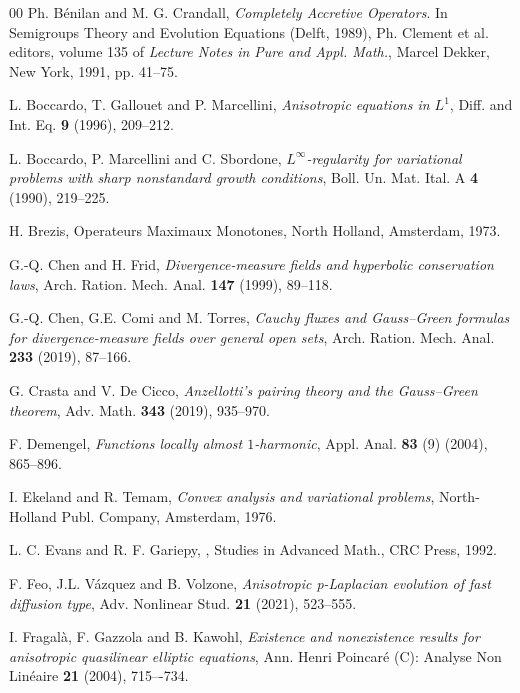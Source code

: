 \documentclass[reqno,12pt]{amsart}
\numberwithin{equation}{section}
\begin{document}
\begin{thebibliography}{00}
 Ph. B\'enilan and M. G. Crandall, {\it Completely Accretive Operators}. In Semigroups Theory and Evolution Equations (Delft, 1989), Ph. Clement et al. editors, volume 135 of {\it Lecture Notes in Pure and Appl. Math.}, Marcel Dekker, New York, 1991, pp. 41--75.

 L. Boccardo, T. Gallouet and P. Marcellini, {\it Anisotropic equations in $L^1$}, Diff. and Int. Eq. {\bf 9} (1996), 209--212.

 L. Boccardo, P. Marcellini and C. Sbordone, {\it $L^\infty$-regularity for variational problems with sharp nonstandard growth conditions}, Boll. Un. Mat. Ital. A {\bf 4} (1990), 219--225.

 H. Brezis, {Operateurs Maximaux Monotones}, North Holland, Amsterdam, 1973.

 G.-Q. Chen and H. Frid, {\it Divergence-measure fields and hyperbolic conservation laws}, Arch. Ration. Mech. Anal. {\bf 147} (1999), 89--118.

 G.-Q. Chen, G.E. Comi and M. Torres, {\it Cauchy fluxes and Gauss–Green formulas for divergence-measure fields over general open sets}, Arch. Ration. Mech. Anal. {\bf 233} (2019), 87--166.

 G. Crasta and V. De Cicco, {\it Anzellotti's pairing theory and the Gauss–Green theorem}, Adv. Math. {\bf 343} (2019), 935--970.

 F. Demengel, {\it Functions locally almost $1$-harmonic}, Appl. Anal. {\bf 83} (9) (2004), 865--896.


 I. Ekeland and R. Temam, {\it Convex analysis and variational problems}, North-Holland Publ. Company, Amsterdam, 1976.

 L. C. Evans and R. F. Gariepy, , \newblock Studies in Advanced Math., CRC Press, 1992.

 F. Feo, J.L. V\'{a}zquez and B. Volzone, {\it Anisotropic p-Laplacian evolution of fast diffusion type}, Adv. Nonlinear Stud. {\bf 21} (2021), 523--555.

 I. Fragal\`{a}, F. Gazzola and B. Kawohl, {\it Existence and nonexistence results for anisotropic quasilinear elliptic equations},  Ann. Henri Poincar\'e (C): Analyse Non Lin\'eaire {\bf 21} (2004), 715–-734.


\end{thebibliography}
\end{document}
